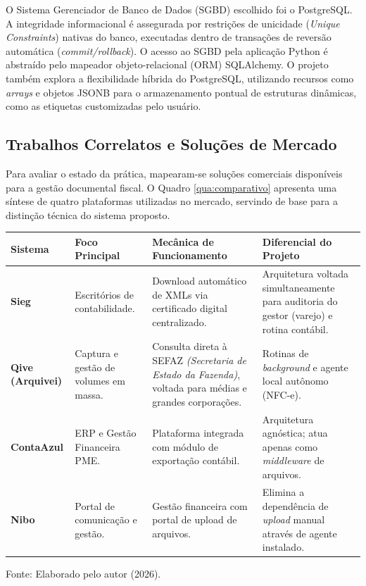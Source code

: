 \documentclass[12pt]{article}
\begin{document}
O Sistema Gerenciador de Banco de Dados (SGBD) escolhido foi o PostgreSQL. A integridade informacional é assegurada por restrições de unicidade (\textit{Unique Constraints}) nativas do banco, executadas dentro de transações de reversão automática (\textit{commit/rollback}). O acesso ao SGBD pela aplicação Python é abstraído pelo mapeador objeto-relacional (ORM) SQLAlchemy. O projeto também explora a flexibilidade híbrida do PostgreSQL, utilizando recursos como \textit{arrays} e objetos JSONB para o armazenamento pontual de estruturas dinâmicas, como as etiquetas customizadas pelo usuário.

\subsection{Trabalhos Correlatos e Soluções de Mercado}

Para avaliar o estado da prática, mapearam-se soluções comerciais disponíveis para a gestão documental fiscal. O Quadro \ref{qua:comparativo} apresenta uma síntese de quatro plataformas utilizadas no mercado, servindo de base para a distinção técnica do sistema proposto.

\begin{quadro}[H]
\centering
\scriptsize
\caption{Comparativo de Soluções de Mercado}
\vspace{0.2cm}
\begin{tabular}{p{2.5cm} p{3cm} p{4.5cm} p{4cm}}
\toprule
\textbf{Sistema} & \textbf{Foco Principal} & \textbf{Mecânica de Funcionamento} & \textbf{Diferencial do Projeto} \\ 
\midrule
\textbf{Sieg}\tablefootnote{\url{https://sieg.com}} & Escritórios de contabilidade. & Download automático de XMLs via certificado digital centralizado. & Arquitetura voltada simultaneamente para auditoria do gestor (varejo) e rotina contábil. \\ 
\textbf{Qive (Arquivei)}\tablefootnote{\url{https://qive.com.br}} & Captura e gestão de volumes em massa. & Consulta direta à SEFAZ \textit{(Secretaria de Estado da Fazenda)}, voltada para médias e grandes corporações. & Rotinas de \textit{background} e agente local autônomo (NFC-e). \\ 
\textbf{ContaAzul}\tablefootnote{\url{https://contaazul.com}} & ERP e Gestão Financeira PME. & Plataforma integrada com módulo de exportação contábil. & Arquitetura agnóstica; atua apenas como \textit{middleware} de arquivos. \\ 
\textbf{Nibo}\tablefootnote{\url{https://www.nibo.com.br}} & Portal de comunicação e gestão. & Gestão financeira com portal de upload de arquivos. & Elimina a dependência de \textit{upload} manual através de agente instalado. \\ 
\bottomrule
\end{tabular}
\vspace{0.1cm}
\centerline{\footnotesize Fonte: Elaborado pelo autor (2026).}
\label{qua:comparativo}
\end{quadro}
\end{document}
